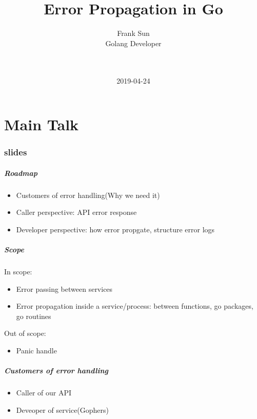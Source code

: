 \documentclass[9pt]{beamer}
\title[Error Propagation in Go]{Error Propagation in Go}
\author[Frank Sun]{
 \parbox{0.26\textwidth}{
	\texorpdfstring
	  {
		\centering
 		Frank Sun \\
 		Golang Developer \\
 		\myblue{\href{mailto:elitegoblinrb@gmail.com}{\texttt{elitegoblinrb@gmail.com}}} \\
 		\myblue{\href{http://elitegoblin.github.io}{\texttt{http://elitegoblin.github.io}}} \\
 	  }
	{Frank Sun}
}
 }
\date{2019-04-24}
\begin{document}
\frame{\titlepage
}

\part<presentation>{Main Talk}

\section[slides]{slides}

\begin{frame}[fragile]
\frametitle{Roadmap}


\begin{itemize}
\item Customers of error handling(Why we need it)
\item Caller perspective: API error response
\item Developer perspective: how error propgate, structure error logs
\end{itemize}


\end{frame}

\begin{frame}[fragile]
\frametitle{Scope}


In scope: 


\begin{itemize}
\item Error passing between services
\item Error propagation inside a service/process: between functions, go packages, go routines
\end{itemize}

Out of scope: 


\begin{itemize}
\item Panic handle
\end{itemize}


\end{frame}

\begin{frame}[fragile]
\frametitle{Customers of error handling}


\begin{itemize}
\item Caller of our API
\item Deveoper of service(Gophers)
\end{itemize}


\end{frame}
\end{document}
